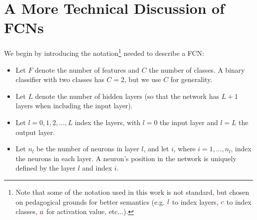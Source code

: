 \documentclass[11pt, a4paper]{article}
\newcommand{\myhref}[2]{\hyperref[#1]{\textcolor{blue}{#2}}}
\begin{document}
\newpage
\appendix
\section{A More Technical Discussion of FCNs} \label{s:appendix-fcn}
We begin by introducing the notation\footnote{Note that some of the notation used in this work is not standard, but chosen on pedagogical grounds for better semantics (e.g. $ {\color{myMaroon} l} $ to index {\color{myMaroon} l}ayers, $ {\color{myMaroon} c} $ to index {\color{myMaroon} c}lasses, $ {\color{myMaroon} a} $ for {\color{myMaroon} a}ctivation value, etc...).} needed to describe a FCN:
\begin{itemize}

    \item Let $ F $ denote the number of features and $ C $ the number of classes.
    A binary classifier with two classes has $ C = 2 $, but we use $ C $ for generality.

    \item Let $ L $ denote the number of hidden layers (so that the network has $ L + 1 $ layers when including the input layer).

    \item Let $ l = 0, 1, 2, ..., L $ index the layers, with $ l = 0 $ the input layer and $ l = L $ the output layer.

    \item Let $ n_{l} $ be the number of neurons in layer $ l $, and let $ i $, where $ i = 1, \ldots, n_{l} $, index the neurons in each layer.
    A neuron's position in the network is uniquely defined by the layer $ l $ and index $ i $.


\end{itemize}
\end{document}
